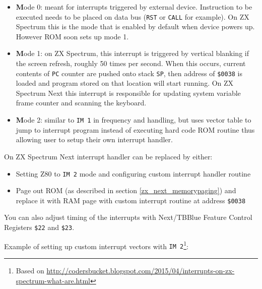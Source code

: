 \documentclass[12pt,twoside,openright,a4paper]{book}
\begin{document}
\begin{itemize}
	\item {\textbf Mode 0}: meant for interrupts triggered by external device. Instruction to be executed needs to be placed on data bus ({\tt RST} or {\tt CALL} for example). On ZX Spectrum this is the mode that is enabled by default when device powers up. However ROM soon sets up mode 1.
	
	\item {\textbf Mode 1}: on ZX Spectrum, this interrupt is triggered by vertical blanking if the screen refresh, roughly 50 times per second. When this occurs, current contents of {\tt PC} counter are pushed onto stack {\tt SP}, then address of {\tt \$0038} is loaded and program stored on that location will start running. On ZX Spectrum Next this interrupt is responsible for updating system variable frame counter and scanning the keyboard.
	
	\item {\textbf Mode 2}: similar to {\tt IM 1} in frequency and handling, but uses vector table to jump to interrupt program instead of executing hard code ROM routine thus allowing user to setup their own interrupt handler.
\end{itemize}

On ZX Spectrum Next interrupt handler can be replaced by either:

\begin{itemize}
	\item Setting Z80 to {\tt IM 2} mode and configuring custom interrupt handler routine
	
	\item Page out ROM (as described in section \ref{zx_next_memorypaging}) and replace it with RAM page with custom interrupt routine at address {\tt \$0038}
\end{itemize}

You can also adjust timing of the interrupts with Next/TBBlue Feature Control Registers {\tt \$22} and {\tt \$23}.

\pagebreak
Example of setting up custom interrupt vectors with {\tt IM 2}\footnote{Based on \url{http://codersbucket.blogspot.com/2015/04/interrupts-on-zx-spectrum-what-are.html}}:
\end{document}
